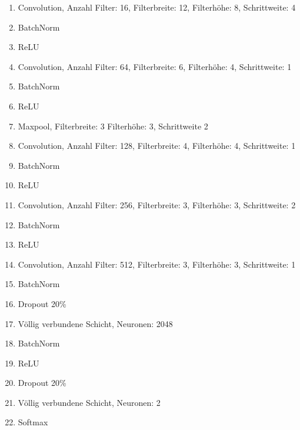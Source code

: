 \documentclass[12pt,a4paper]{report}
\begin{document}
\begin{enumerate}
    \setlength\itemsep{0cm}
    \setlength{\parskip}{0pt}
    \setlength{\parsep}{0pt}
    \item Convolution, Anzahl Filter: 16, Filterbreite: 12, Filterhöhe: 8, Schrittweite: 4
    \item BatchNorm
    \item ReLU
    \item Convolution, Anzahl Filter: 64, Filterbreite: 6, Filterhöhe: 4, Schrittweite: 1
    \item BatchNorm
    \item ReLU
    \item Maxpool, Filterbreite: 3 Filterhöhe: 3, Schrittweite 2
    \item Convolution, Anzahl Filter: 128, Filterbreite: 4, Filterhöhe: 4, Schrittweite: 1
    \item BatchNorm
    \item ReLU
    \item Convolution, Anzahl Filter: 256, Filterbreite: 3, Filterhöhe: 3, Schrittweite: 2
    \item BatchNorm
    \item ReLU
    \item Convolution, Anzahl Filter: 512, Filterbreite: 3, Filterhöhe: 3, Schrittweite: 1
    \item BatchNorm
    \item Dropout 20\%
    \item Völlig verbundene Schicht, Neuronen: 2048
    \item BatchNorm
    \item ReLU
    \item Dropout 20\%
    \item Völlig verbundene Schicht, Neuronen: 2
    \item Softmax
\end{enumerate}
\end{document}
